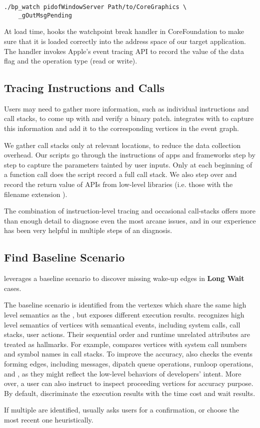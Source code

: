\begin{lstlisting}
./bp_watch pidofWindowServer Path/to/CoreGraphics \
	_gOutMsgPending
\end{lstlisting}

At load time, \xxx hooks the watchpoint break handler in CoreFoundation to
make sure that it is loaded correctly into the address space of our target
application. The handler invokes Apple's event tracing API to record the value
of the data flag and the operation type (read or write).

\subsection{Tracing Instructions and Calls}

Users may need to gather more information, such as individual instructions and
call stacks, to come up with and verify a binary patch. \xxx integrates with
\vv{lldb} to capture this information and add it to the corresponding vertices
in the event graph.

We gather call stacks only at relevant locations, to reduce the data collection
overhead. Our \vv{lldb} scripts go through the instructions of apps and
frameworks step by step to capture the parameters tainted by user inputs. Only
at each beginning of a function call does the script record a full call stack.
We also step over and record the return value of APIs from low-level libraries
(i.e. those with the filename extension \vv{.dylib}).

The combination of instruction-level tracing and occasional call-stacks offers
more than enough detail to diagnose even the most arcane issues, and in our
experience has been very helpful in multiple steps of an \xxx diagnosis.

\subsection{Find Baseline Scenario}

\xxx leverages a baseline scenario to discover missing wake-up edges in
\textbf{Long Wait} cases. 

The baseline scenario is identified from the vertexes which share the same
high level semantics as the \spinningnode, but exposes different execution
results. \xxx recognizes high level semantics of vertices with semantical
events, including system calls, call stacks, user actions. Their sequential
order and runtime unrelated attributes are treated as hallmarks. For example,
\xxx compares vertices with system call numbers and symbol names in call stacks.
To improve the accuracy, \xxx also checks the events forming edges, including
messages, dipatch queue operations, runloop operations, \dataflagread and
\dataflagwrite, as they might reflect the low-level behaviors of developers'
intent. More over, a user can also instruct \xxx to inspect proceeding vertices
for accuracy purpose. By default, \xxx discriminate the execution results with
the time cost and wait results.

If multiple \similarnode are identified, \xxx usually asks users for a
confirmation, or choose the most recent one heuristically.
